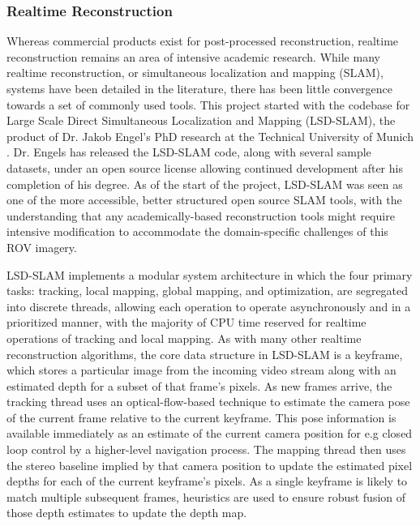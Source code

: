 \documentclass[letterpaper,12pt]{article}
\begin{document}
\subsubsection{Realtime Reconstruction}

Whereas commercial products exist for post-processed reconstruction, realtime reconstruction remains an area of intensive academic research.   While many realtime reconstruction, or simultaneous localization and mapping (SLAM), systems have been detailed in the literature, there has been little convergence towards a set of commonly used tools.   This project started with the codebase for Large Scale Direct Simultaneous Localization and Mapping (LSD-SLAM), the product of Dr. Jakob Engel's PhD research at the Technical University of Munich \cite{engel2014lsd}.   Dr. Engels has released the LSD-SLAM code, along with several sample datasets, under an open source license allowing continued development after his completion of his degree.   As of the start of the project, LSD-SLAM was seen as one of the more accessible, better structured open source SLAM tools, with the understanding that any academically-based reconstruction tools might require intensive modification to accommodate the domain-specific challenges of this ROV imagery.

LSD-SLAM implements a modular system architecture in which the four primary tasks: tracking, local mapping, global mapping, and optimization, are segregated into discrete threads, allowing each operation to operate asynchronously and in a prioritized manner, with the majority of CPU time reserved for realtime operations of tracking and local mapping.   As with many other realtime reconstruction algorithms, the core data structure in LSD-SLAM is a keyframe, which stores a particular image from the incoming video stream along with an estimated depth for a subset of that frame's pixels.   As new frames arrive, the tracking thread uses an optical-flow-based technique to estimate the camera pose of the current frame relative to the current keyframe.  This pose information is available immediately as an estimate of the current camera position for e.g closed loop control by a higher-level navigation process.  The mapping thread then uses the stereo baseline implied by that camera position to update the estimated pixel depths for each of the current keyframe's pixels.   As a single keyframe is likely to match multiple subsequent frames, heuristics are used to ensure robust fusion of those depth estimates to update the depth map.
\end{document}
